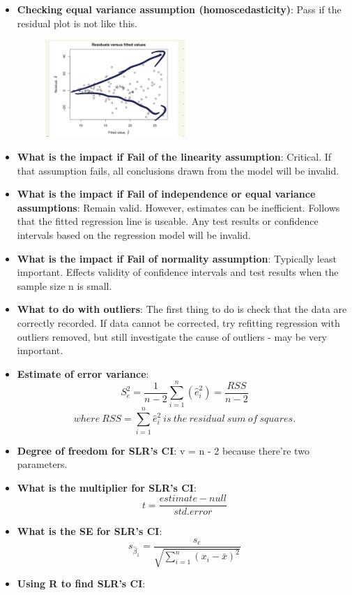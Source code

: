 \documentclass[12pt]{article}
\begin{document}
\begin{itemize}
\begin{figure}[H]
\end{figure}
\item \textbf{Checking equal variance assumption (homoscedasticity)}: Pass if the residual plot is not like this.
\begin{figure}[H]
    \centering
    \includegraphics[width=0.5\textwidth]{6.jpg}
\end{figure}
\item \textbf{What is the impact if Fail of the linearity assumption}: Critical. If that assumption fails, all conclusions drawn from the model will be invalid.
\item \textbf{What is the impact if Fail of independence or equal variance assumptions}: Remain valid. However, estimates can be inefficient. Follows that the fitted regression line is useable. Any test results or confidence intervals based on the regression model will be invalid.
\item \textbf{What is the impact if Fail of normality assumption}: Typically least important. Effects validity of confidence intervals and test results when the sample size n is small.
\item \textbf{What to do with outliers}: The first thing to do is check that the data are correctly recorded. If data cannot be corrected, try refitting regression with outliers removed, but still investigate the cause of outliers - may be very important.
\item \textbf{Estimate of error variance}: 
$$S^2_e = \frac{1}{n-2}\sum_{i=1}^{n}(\hat{e}^2_i)=\frac{RSS}{n-2}$$
$$where \ RSS = \sum_{i=1}^{n}\hat{e}^2_i \ is \ the \ residual \ sum \ of \ squares.$$
\item \textbf{Degree of freedom for SLR's CI}: v = n - 2 because there're two parameters.
\item \textbf{What is the multiplier for SLR's CI}: 
$$t = \frac{estimate - null}{std. error}$$
\item \textbf{What is the SE for SLR's CI}:
$$s_{\hat{\beta}_1} = \frac{s_e}{\sqrt{\sum_{i=1}^{n}(x_i - \bar{x})^2}}$$
\item \textbf{Using R to find SLR's CI}: 

\end{itemize}
\end{document}
